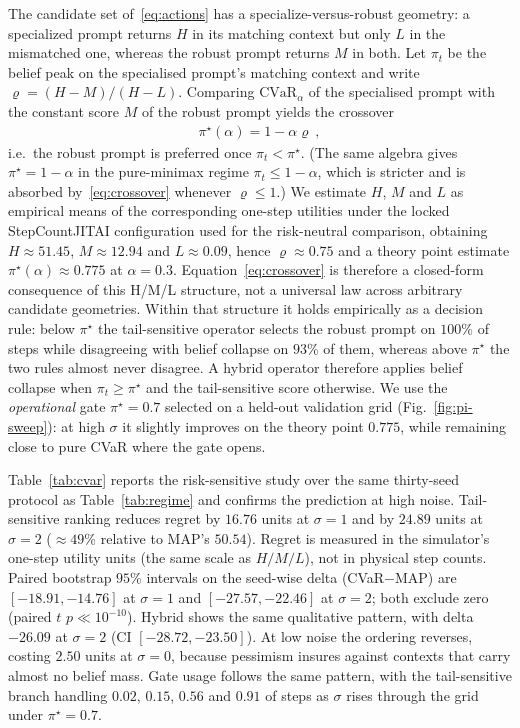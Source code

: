 \documentclass[journal]{IEEEtran}
\begin{document}
The candidate set of~\eqref{eq:actions} has a specialize-versus-robust geometry: a specialized prompt returns \(H\) in its matching context but only \(L\) in the mismatched one, whereas the robust prompt returns \(M\) in both.
Let \(\pi_t\) be the belief peak on the specialised prompt's matching context and write \(\varrho=(H-M)/(H-L)\).
Comparing \(\mathrm{CVaR}_\alpha\) of the specialised prompt with the constant score \(M\) of the robust prompt yields the crossover
\begin{align}
\label{eq:crossover}
\pi^\star(\alpha)=1-\alpha\varrho\:,
\end{align}
i.e.\ the robust prompt is preferred once \(\pi_t<\pi^\star\).
(The same algebra gives \(\pi^\star=1-\alpha\) in the pure-minimax regime \(\pi_t\le 1-\alpha\), which is stricter and is absorbed by~\eqref{eq:crossover} whenever \(\varrho\le 1\).)
We estimate \(H\), \(M\) and \(L\) as empirical means of the corresponding one-step utilities under the locked StepCountJITAI configuration used for the risk-neutral comparison, obtaining \(H\approx 51.45\), \(M\approx 12.94\) and \(L\approx 0.09\), hence \(\varrho\approx 0.75\) and a theory point estimate \(\pi^\star(\alpha)\approx 0.775\) at \(\alpha=0.3\).
Equation~\eqref{eq:crossover} is therefore a closed-form consequence of this H/M/L structure, not a universal law across arbitrary candidate geometries.
Within that structure it holds empirically as a decision rule: below \(\pi^\star\) the tail-sensitive operator selects the robust prompt on \(100\%\) of steps while disagreeing with belief collapse on \(93\%\) of them, whereas above \(\pi^\star\) the two rules almost never disagree.
A hybrid operator therefore applies belief collapse when \(\pi_t\ge\pi^\star\) and the tail-sensitive score otherwise.
We use the \emph{operational} gate \(\pi^\star=0.7\) selected on a held-out validation grid (Fig.~\ref{fig:pi-sweep}): at high \(\sigma\) it slightly improves on the theory point \(0.775\), while remaining close to pure CVaR where the gate opens.

Table~\ref{tab:cvar} reports the risk-sensitive study over the same thirty-seed protocol as Table~\ref{tab:regime} and confirms the prediction at high noise.
Tail-sensitive ranking reduces regret by \(16.76\) units at \(\sigma=1\) and by \(24.89\) units at \(\sigma=2\) (\(\approx 49\%\) relative to MAP's \(50.54\)).
Regret is measured in the simulator's one-step utility units (the same scale as \(H/M/L\)), not in physical step counts.
Paired bootstrap \(95\%\) intervals on the seed-wise delta (CVaR\(-\)MAP) are \([-18.91,-14.76]\) at \(\sigma=1\) and \([-27.57,-22.46]\) at \(\sigma=2\); both exclude zero (paired \(t\) \(p\ll 10^{-10}\)).
Hybrid shows the same qualitative pattern, with delta \(-26.09\) at \(\sigma=2\) (CI \([-28.72,-23.50]\)).
At low noise the ordering reverses, costing \(2.50\) units at \(\sigma=0\), because pessimism insures against contexts that carry almost no belief mass.
Gate usage follows the same pattern, with the tail-sensitive branch handling \(0.02\), \(0.15\), \(0.56\) and \(0.91\) of steps as \(\sigma\) rises through the grid under \(\pi^\star=0.7\).
\end{document}
